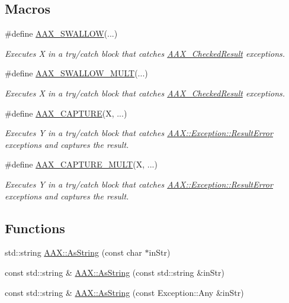 \subsection*{Macros}
\begin{DoxyCompactItemize}
\item 
\#define \mbox{\hyperlink{a00497_a8f177823e9388c5163d1b402a9069bce}{A\+A\+X\+\_\+\+S\+W\+A\+L\+L\+OW}}(...)
\begin{DoxyCompactList}\small\item\em Executes {\itshape X} in a try/catch block that catches \mbox{\hyperlink{a01601}{A\+A\+X\+\_\+\+Checked\+Result}} exceptions. \end{DoxyCompactList}\item 
\#define \mbox{\hyperlink{a00497_aef6db72a3774d079609f94720928cdd6}{A\+A\+X\+\_\+\+S\+W\+A\+L\+L\+O\+W\+\_\+\+M\+U\+LT}}(...)
\begin{DoxyCompactList}\small\item\em Executes {\itshape X} in a try/catch block that catches \mbox{\hyperlink{a01601}{A\+A\+X\+\_\+\+Checked\+Result}} exceptions. \end{DoxyCompactList}\item 
\#define \mbox{\hyperlink{a00497_af9972551e4546e894010f99eade68c94}{A\+A\+X\+\_\+\+C\+A\+P\+T\+U\+RE}}(X, ...)
\begin{DoxyCompactList}\small\item\em Executes {\itshape Y} in a try/catch block that catches \mbox{\hyperlink{a01597}{A\+A\+X\+::\+Exception\+::\+Result\+Error}} exceptions and captures the result. \end{DoxyCompactList}\item 
\#define \mbox{\hyperlink{a00497_a078be92d3d19a5a4b3da2b55ae5ac1c9}{A\+A\+X\+\_\+\+C\+A\+P\+T\+U\+R\+E\+\_\+\+M\+U\+LT}}(X, ...)
\begin{DoxyCompactList}\small\item\em Executes {\itshape Y} in a try/catch block that catches \mbox{\hyperlink{a01597}{A\+A\+X\+::\+Exception\+::\+Result\+Error}} exceptions and captures the result. \end{DoxyCompactList}\end{DoxyCompactItemize}
\subsection*{Functions}
\begin{DoxyCompactItemize}
\item 
std\+::string \mbox{\hyperlink{a00852_a8fbde5607de487515bcb55631bc1377d}{A\+A\+X\+::\+As\+String}} (const char $\ast$in\+Str)
\item 
const std\+::string \& \mbox{\hyperlink{a00852_a1bdf9d0d3be5b5f11d47df256a2e9490}{A\+A\+X\+::\+As\+String}} (const std\+::string \&in\+Str)
\item 
const std\+::string \& \mbox{\hyperlink{a00852_a9d87a7ed401f9deb8386a14c7bd8aaae}{A\+A\+X\+::\+As\+String}} (const Exception\+::\+Any \&in\+Str)
\end{DoxyCompactItemize}


